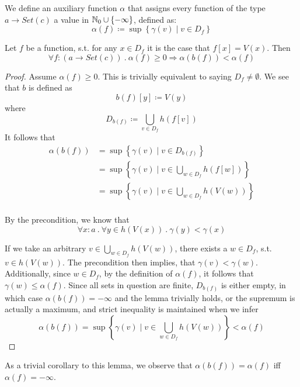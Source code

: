 

We define an auxiliary function $\alpha$ that assigns every function of the type $a \to Set(c)$ a value in $\mathbb N_0 \cup \{-\infty\}$, defined as:
\[
\alpha(f) \coloneqq \sup\left\{ \gamma(v) \mid v \in D_f \right\}
\]

\begin{lemma}\label{lemma2}
Let $f$ be a function, s.t. for any $x \in D_f$ it is the case that $f[x] = V(x)$. Then
\[
\forall f\colon (a \to Set(c)) \ .\ \alpha(f) \ge 0 \Rightarrow \alpha(b(f)) < \alpha(f)
\]
\end{lemma}

\begin{proof}
Assume $\alpha(f) \ge 0$. This is trivially equivalent to saying $D_f \ne \emptyset$.
We see that $b$ is defined as
\[
b(f)[y] \coloneqq V(y)
\]
where 
\[
D_{b(f)} \coloneqq \bigcup_{v \in D_f} h(f[v])
\]
It follows that 
\begin{align*} 
\alpha(b(f)) &= \sup\left\{ \gamma(v) \mid v \in D_{b(f)} \right\} \\
&= \sup\left\{ \gamma(v) \mid v \in \bigcup_{w \in D_f} h(f[w]) \right\} \\
&= \sup\left\{ \gamma(v) \mid v \in \bigcup_{w \in D_f} h(V(w)) \right\} \\
\end{align*}

By the precondition, we know that 
\[
\forall x\colon a \ .\ \forall y \in h(V(x)) \ .\ \gamma(y) < \gamma(x) 
\]

If we take an arbitrary $v \in \bigcup_{w \in D_f} h(V(w))$, there exists a
$w \in D_f$, s.t. $v \in h(V(w))$. The precondition then implies, that $\gamma(v) < \gamma(w)$.
Additionally, since $w \in D_f$, by the definition of $\alpha(f)$, it follows that $\gamma(w) \le \alpha(f)$.
Since all sets in question are finite, $D_{b(f)}$ is either empty, in which case $\alpha(b(f)) = -\infty$ and the lemma trivially holds, or the supremum is actually a maximum, and strict inequality is maintained when we infer
\[
\alpha(b(f)) = \sup\left\{ \gamma(v) \mid v \in \bigcup_{w \in D_f} h(V(w)) \right\} < \alpha(f)
\]
\end{proof}
As a trivial corollary to this lemma, we observe that $\alpha(b(f)) = \alpha(f)$ iff $\alpha(f) = -\infty$.

